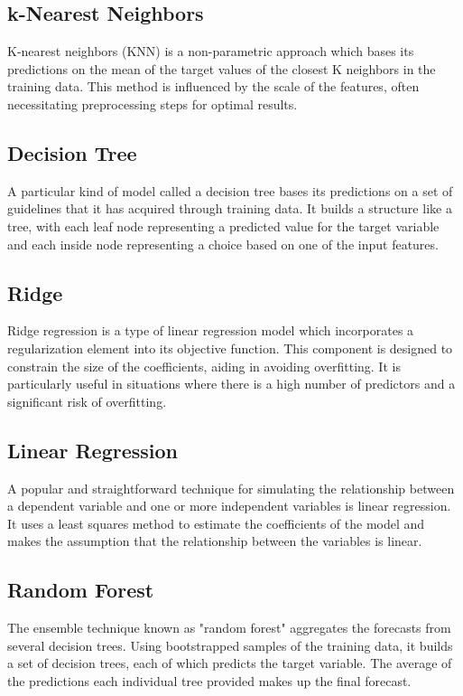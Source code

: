 \documentclass[12pt, titlepage]{article}
\begin{document}
\subsection{k-Nearest Neighbors}
K-nearest neighbors (KNN) is a non-parametric approach which bases its predictions on the mean of the target values of the closest K neighbors in the training data. This method is influenced by the scale of the features, often necessitating preprocessing steps for optimal results.

\subsection{Decision Tree}
A particular kind of model called a decision tree bases its predictions on a set of guidelines that it has acquired through training data. It builds a structure like a tree, with each leaf node representing a predicted value for the target variable and each inside node representing a choice based on one of the input features.

\subsection{Ridge}
Ridge regression is a type of linear regression model which incorporates a regularization element into its objective function. This component is designed to constrain the size of the coefficients, aiding in avoiding overfitting. It is particularly useful in situations where there is a high number of predictors and a significant risk of overfitting.

\subsection{Linear Regression}
A popular and straightforward technique for simulating the relationship between a dependent variable and one or more independent variables is linear regression. It uses a least squares method to estimate the coefficients of the model and makes the assumption that the relationship between the variables is linear.

\subsection{Random Forest}
The ensemble technique known as "random forest" aggregates the forecasts from several decision trees. Using bootstrapped samples of the training data, it builds a set of decision trees, each of which predicts the target variable. The average of the predictions each individual tree provided makes up the final forecast.
\end{document}
